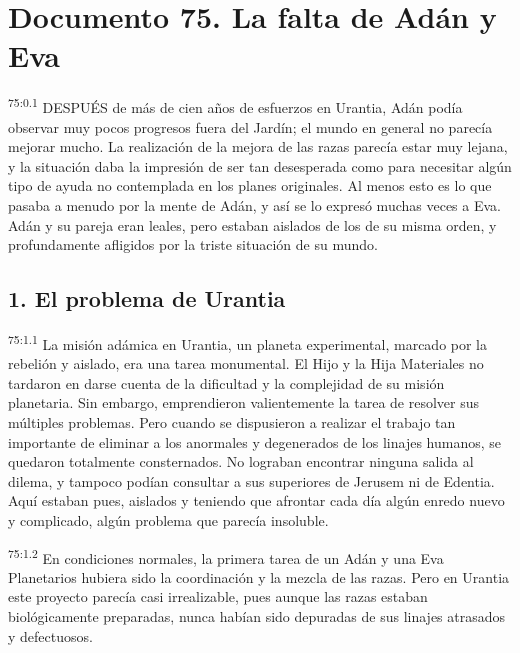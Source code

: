 \chapter{Documento 75. La falta de Adán y Eva}
\par
\textsuperscript{75:0.1} DESPUÉS de más de cien años de esfuerzos en Urantia, Adán podía observar muy pocos progresos fuera del Jardín; el mundo en general no parecía mejorar mucho. La realización de la mejora de las razas parecía estar muy lejana, y la situación daba la impresión de ser tan desesperada como para necesitar algún tipo de ayuda no contemplada en los planes originales. Al menos esto es lo que pasaba a menudo por la mente de Adán, y así se lo expresó muchas veces a Eva. Adán y su pareja eran leales, pero estaban aislados de los de su misma orden, y profundamente afligidos por la triste situación de su mundo.

\section*{1. El problema de Urantia}
\par
\textsuperscript{75:1.1} La misión adámica en Urantia, un planeta experimental, marcado por la rebelión y aislado, era una tarea monumental. El Hijo y la Hija Materiales no tardaron en darse cuenta de la dificultad y la complejidad de su misión planetaria. Sin embargo, emprendieron valientemente la tarea de resolver sus múltiples problemas. Pero cuando se dispusieron a realizar el trabajo tan importante de eliminar a los anormales y degenerados de los linajes humanos, se quedaron totalmente consternados. No lograban encontrar ninguna salida al dilema, y tampoco podían consultar a sus superiores de Jerusem ni de Edentia. Aquí estaban pues, aislados y teniendo que afrontar cada día algún enredo nuevo y complicado, algún problema que parecía insoluble.

\par
\textsuperscript{75:1.2} En condiciones normales, la primera tarea de un Adán y una Eva Planetarios hubiera sido la coordinación y la mezcla de las razas. Pero en Urantia este proyecto parecía casi irrealizable, pues aunque las razas estaban biológicamente preparadas, nunca habían sido depuradas de sus linajes atrasados y defectuosos.

